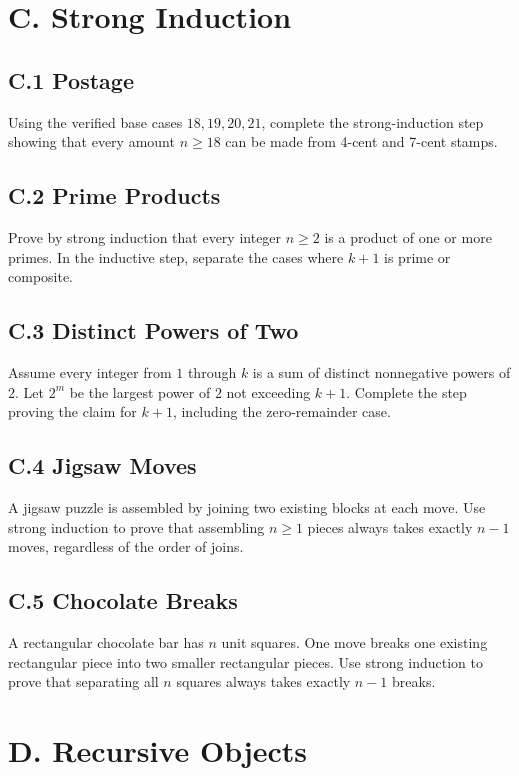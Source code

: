 \documentclass[11pt]{article}
\begin{document}
\newpage
\section*{C. Strong Induction}

\subsection*{C.1 Postage}
Using the verified base cases $18,19,20,21$, complete the strong-induction step
showing that every amount $n\ge18$ can be made from 4-cent and 7-cent stamps.

\subsection*{C.2 Prime Products}
Prove by strong induction that every integer $n\ge2$ is a product of one or
more primes. In the inductive step, separate the cases where $k+1$ is prime or
composite.

\subsection*{C.3 Distinct Powers of Two}
Assume every integer from $1$ through $k$ is a sum of distinct nonnegative
powers of $2$. Let $2^m$ be the largest power of $2$ not exceeding $k+1$.
Complete the step proving the claim for $k+1$, including the zero-remainder case.

\subsection*{C.4 Jigsaw Moves}
A jigsaw puzzle is assembled by joining two existing blocks at each move. Use
strong induction to prove that assembling $n\ge1$ pieces always takes exactly
$n-1$ moves, regardless of the order of joins.

\subsection*{C.5 Chocolate Breaks}
A rectangular chocolate bar has $n$ unit squares. One move breaks one existing
rectangular piece into two smaller rectangular pieces. Use strong induction to
prove that separating all $n$ squares always takes exactly $n-1$ breaks.

\newpage
\section*{D. Recursive Objects}
\end{document}
